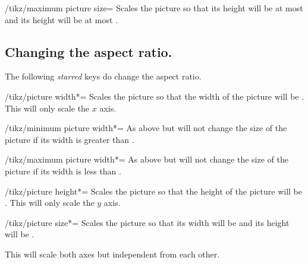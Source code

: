 \begin{multicols}{2}
\begin{key}{/tikz/maximum picture size=}
  Scales the picture so that its height will be at most 
  and its height will be at most .
\end{key}

\subsection{Changing the aspect ratio.}
The following \emph{starred} keys do change the aspect ratio.
\begin{key}{/tikz/picture width*=}
  Scales the picture so that the width of the picture will be .
  This will only scale the $x$ axis.
\end{key}

\begin{key}{/tikz/minimum picture width*=}
  As above but will not change the size of the picture
  if its width is greater than .
\end{key}

\begin{key}{/tikz/maximum picture width*=}
  As above but will not change the size of the picture
  if its width is less than .
\end{key}

\begin{key}{/tikz/picture height*=}
  Scales the picture so that the height of the picture will be .
  This will only scale the $y$ axis.
\end{key}

\begin{key}{/tikz/picture size*=}
  Scales the picture so that its width will be 
  and its height will be .
  
  This will scale both axes but independent from each other.
\end{key}
\end{multicols}
